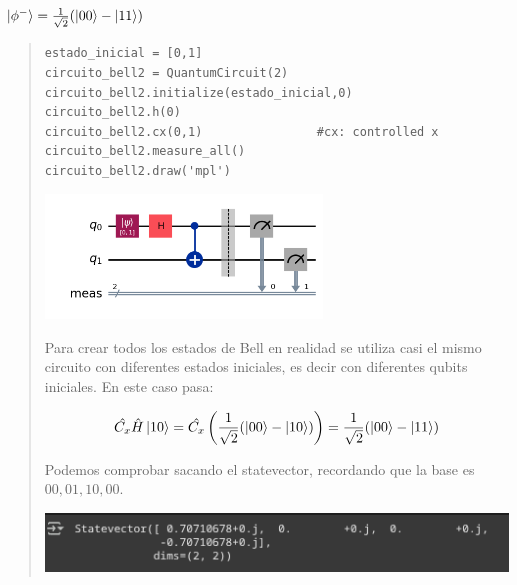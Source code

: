 \textbf{$\ket{\phi^-}=\frac{1}{\sqrt{2}} (\ket{00}-\ket{11})$} \vspace{.3cm}

\begin{quote}
    \begin{verbatim}
estado_inicial = [0,1]
circuito_bell2 = QuantumCircuit(2)
circuito_bell2.initialize(estado_inicial,0)
circuito_bell2.h(0)
circuito_bell2.cx(0,1)                #cx: controlled x
circuito_bell2.measure_all()
circuito_bell2.draw('mpl')
    \end{verbatim}
    \vspace{.3cm}
    \begin{center}
        \includegraphics[height=3.3cm]{src/Img/3.1.png}
    \end{center}

    Para crear todos los estados de Bell en realidad se utiliza casi el mismo circuito con
    diferentes estados iniciales, es decir con diferentes qubits iniciales. En este caso pasa:

    \begin{align*}
        \hat{C_x}\hat{H}\ket{10}
        = \hat{C_x} \left( \frac{1}{\sqrt{2}} (\ket{00}-\ket{10}) \right)
        = \frac{1}{\sqrt{2}} (\ket{00}-\ket{11})
    \end{align*}

    Podemos comprobar sacando el statevector, recordando que la base es $00,01,10,00$.
    \vspace{.5cm}

    \begin{center}
        \includegraphics[width=.8\textwidth]{src/Img/3.1.r.png}
    \end{center}
\end{quote}
\vspace{.5cm}
